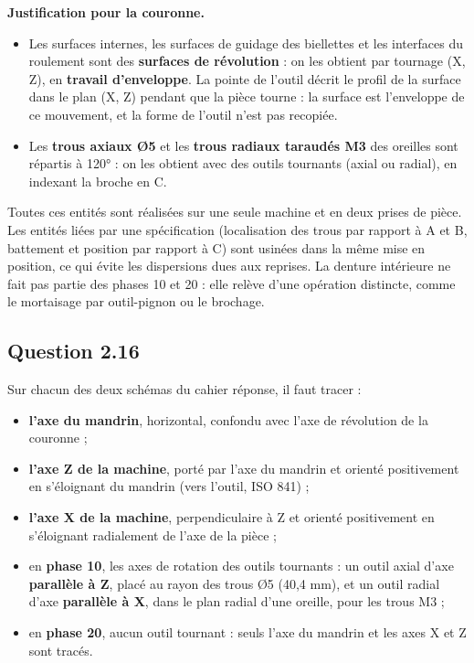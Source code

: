 \documentclass[11pt,a4paper]{article}
\providecommand{\tightlist}{\setlength{\itemsep}{0pt}\setlength{\parskip}{0pt}}
\begin{document}
\textbf{Justification pour la couronne.}

\begin{itemize}
\tightlist
\item
  Les surfaces internes, les surfaces de guidage des biellettes et les interfaces du roulement sont des \textbf{surfaces de révolution} : on les obtient par tournage (X, Z), en \textbf{travail d'enveloppe}. La pointe de l'outil décrit le profil de la surface dans le plan (X, Z) pendant que la pièce tourne : la surface est l'enveloppe de ce mouvement, et la forme de l'outil n'est pas recopiée.
\item
  Les \textbf{trous axiaux Ø5} et les \textbf{trous radiaux taraudés M3} des oreilles sont répartis à 120° : on les obtient avec des outils tournants (axial ou radial), en indexant la broche en C.
\end{itemize}

Toutes ces entités sont réalisées sur une seule machine et en deux prises de pièce. Les entités liées par une spécification (localisation des trous par rapport à A et B, battement et position par rapport à C) sont usinées dans la même mise en position, ce qui évite les dispersions dues aux reprises. La denture intérieure ne fait pas partie des phases 10 et 20 : elle relève d'une opération distincte, comme le mortaisage par outil-pignon ou le brochage.

\hypertarget{question-2.16}{%
\subsection{Question 2.16}\label{question-2.16}}

Sur chacun des deux schémas du cahier réponse, il faut tracer :

\begin{itemize}
\tightlist
\item
  \textbf{l'axe du mandrin}, horizontal, confondu avec l'axe de révolution de la couronne ;
\item
  \textbf{l'axe Z de la machine}, porté par l'axe du mandrin et orienté positivement en s'éloignant du mandrin (vers l'outil, ISO 841) ;
\item
  \textbf{l'axe X de la machine}, perpendiculaire à Z et orienté positivement en s'éloignant radialement de l'axe de la pièce ;
\item
  en \textbf{phase 10}, les axes de rotation des outils tournants : un outil axial d'axe \textbf{parallèle à Z}, placé au rayon des trous Ø5 (40,4 mm), et un outil radial d'axe \textbf{parallèle à X}, dans le plan radial d'une oreille, pour les trous M3 ;
\item
  en \textbf{phase 20}, aucun outil tournant : seuls l'axe du mandrin et les axes X et Z sont tracés.
\end{itemize}
\end{document}
